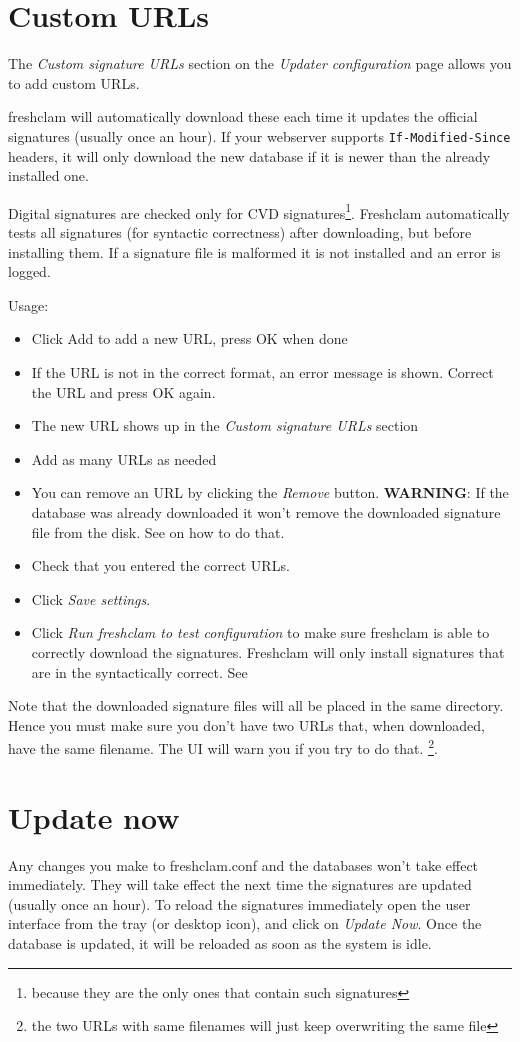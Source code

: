 \section{Custom URLs}
\label{sec:ui_urladd}
The \emph{Custom signature URLs} section on the \emph{Updater configuration}
page allows you to add custom URLs.

\Gls{freshclam} will automatically download these each time it updates the official signatures (usually once an hour).
If your webserver supports \verb+If-Modified-Since+ headers, it will only
download the new database if it is newer than the already installed one.

Digital signatures  are checked only for \gls{CVD} signatures\footnote{because they are the only ones that contain such signatures}.
Freshclam automatically tests all signatures (for syntactic correctness) after downloading, but
before installing them. If a signature file is malformed it is not installed and
an error is logged.

Usage:
\begin{itemize}
\item Click Add to add a new URL, press OK when done
\item If the URL is not in the correct format, an error message is shown.
Correct the URL and press OK again.
\item The new URL shows up in the \emph{Custom signature URLs} section
\item Add as many URLs as needed
\item You can remove an URL by clicking the \emph{Remove} button.
\textbf{WARNING}: If the database was already downloaded it won't remove the downloaded signature file from the disk.
See  on how to do that.
\item Check that you entered the correct URLs.
\item Click \emph{Save settings}.
\item Click \emph{Run freshclam to test configuration} to make sure freshclam is
able to correctly download the signatures. Freshclam will only install
signatures that are in the syntactically correct.
See 
\end{itemize}

Note that the downloaded signature files will all be placed in the same directory. Hence you must make sure you don't have two URLs that, when downloaded, have the same filename.
The UI will warn you if you try to do that. \footnote{the two URLs with same filenames will just keep overwriting the same file}.
\section{Update now}
\label{sec:updatenow}
Any changes you make to \gls{freshclam.conf} and the databases won't take effect immediately.
They will take effect the next time the signatures are updated (usually once an hour).
To reload the signatures immediately open the \CW user interface from the tray (or desktop icon), and click on \emph{Update Now}. 
Once the database is updated, it will be reloaded as soon as the system is idle.